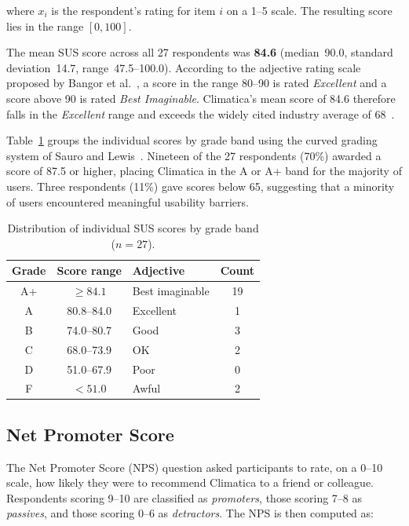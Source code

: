 where $x_i$ is the respondent's rating for item $i$ on a 1--5 scale. The
resulting score lies in the range $[0, 100]$.

The mean SUS score across all 27 respondents was \textbf{84.6} (median~90.0,
standard deviation~14.7, range~47.5--100.0). According to the adjective
rating scale proposed by Bangor et al.~\cite{bangor2009sus}, a score in the
range 80--90 is rated \emph{Excellent} and a score above 90 is rated
\emph{Best Imaginable}. Climatica's mean score of 84.6 therefore falls in the
\emph{Excellent} range and exceeds the widely cited industry average of
68~\cite{brooke1996sus}.

Table~\ref{tab:sus_dist} groups the individual scores by grade band using the
curved grading system of Sauro and Lewis~\cite{sauro2012sus}. Nineteen of the
27 respondents (70\%) awarded a score of 87.5 or higher, placing Climatica in
the A or A+ band for the majority of users. Three respondents (11\%) gave
scores below 65, suggesting that a minority of users encountered meaningful
usability barriers.

\begin{table}[H]
  \centering
  \caption{Distribution of individual SUS scores by grade band ($n = 27$).}
  \label{tab:sus_dist}
  \small
  \begin{tabular}{cclc}
    \toprule
    \textbf{Grade} & \textbf{Score range} & \textbf{Adjective} & \textbf{Count} \\
    \midrule
    A+ & $\geq 84.1$ & Best imaginable & 19 \\
    A  & 80.8--84.0  & Excellent       & 1  \\
    B  & 74.0--80.7  & Good            & 3  \\
    C  & 68.0--73.9  & OK              & 2  \\
    D  & 51.0--67.9  & Poor            & 0  \\
    F  & $< 51.0$    & Awful           & 2  \\
    \bottomrule
  \end{tabular}
  \normalsize
\end{table}

\subsection{Net Promoter Score}\label{EVAL_NPS}

The Net Promoter Score (NPS) question asked participants to rate, on a 0--10
scale, how likely they were to recommend Climatica to a friend or colleague.
Respondents scoring 9--10 are classified as \emph{promoters}, those scoring
7--8 as \emph{passives}, and those scoring 0--6 as \emph{detractors}. The NPS
is then computed as:

